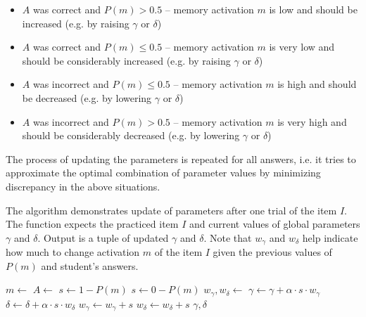 \begin{itemize}
  \item $A$ was correct and $P(m) > 0.5$ -- memory activation $m$ is low and should be increased (e.g. by raising $\gamma$ or $\delta$)
  \item $A$ was correct and $P(m) \leq 0.5$ -- memory activation $m$ is very low and should be considerably increased (e.g. by raising $\gamma$ or $\delta$)
  \item $A$ was incorrect and $P(m) \leq 0.5$ -- memory activation $m$ is high and should be decreased (e.g. by lowering $\gamma$ or $\delta$)
  \item $A$ was incorrect and $P(m) > 0.5$ -- memory activation $m$ is very high and should be considerably decreased (e.g. by lowering $\gamma$ or $\delta$)
\end{itemize}

The process of updating the parameters is repeated for all answers, i.e. it tries to approximate the optimal combination of parameter values by minimizing discrepancy in the above situations.

\begin{algorithm}
  \caption{The algorithm demonstrates update of parameters after one trial of the item $I$. The function expects the practiced item $I$ and current values of global parameters $\gamma$ and $\delta$. Output is a tuple of updated $\gamma$ and $\delta$. Note that $w_{\gamma}$ and $w_{\delta}$ help indicate how much to change activation $m$ of the item $I$ given the previous values of $P(m)$ and student's answers.}
  \label{alg-gradient-descent}
  \begin{algorithmic}[1]
      \State $m \gets$  
      \State $A \gets$  
       
        \State $s \gets 1 - P(m)$
      \Else
        \State $s \gets 0 - P(m)$
      \EndIf
      \State $w_{\gamma}, w_{\delta} \gets$  
      \State $\gamma \gets \gamma + \alpha \cdot s \cdot w_{\gamma}$ 
      \State $\delta \gets \delta + \alpha \cdot s \cdot w_{\delta}$
        \State $w_{\gamma} \gets w_{\gamma} + s$
      \Else
        \State $w_{\delta} \gets w_{\delta} + s$
      \EndIf
      \State {} 
      \State \Return $\gamma, \delta$
    \EndFunction
  \end{algorithmic}
\end{algorithm}

